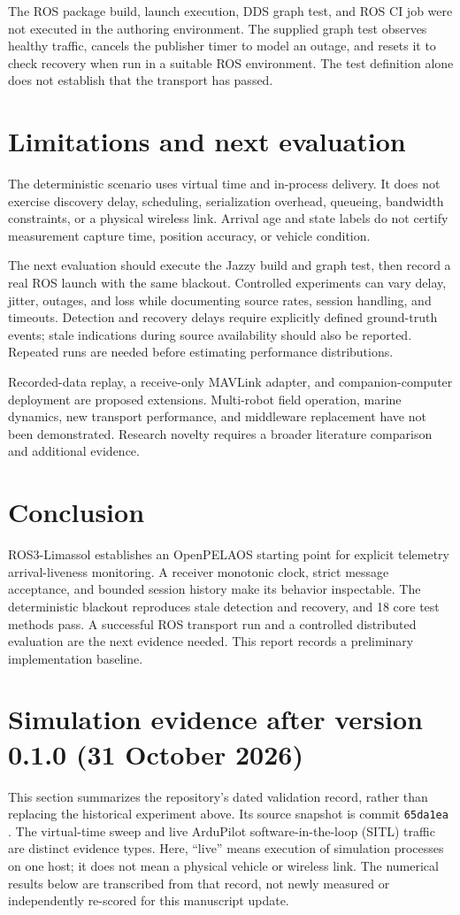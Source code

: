 \documentclass[11pt,a4paper]{article}
\newcommand{\code}[1]{\texttt{#1}}
\begin{document}
The ROS package build, launch execution, DDS graph test, and ROS CI job were not
executed in the authoring environment. The supplied graph test observes healthy
traffic, cancels the publisher timer to model an outage, and resets it to check
recovery when run in a suitable ROS environment. The test definition alone does
not establish that the transport has passed.

\section{Limitations and next evaluation}
The deterministic scenario uses virtual time and in-process delivery. It does not
exercise discovery delay, scheduling, serialization overhead, queueing, bandwidth
constraints, or a physical wireless link. Arrival age and state labels do not
certify measurement capture time, position accuracy, or vehicle condition.

The next evaluation should execute the Jazzy build and graph test, then record
a real ROS launch with the same blackout. Controlled experiments can vary delay,
jitter, outages, and loss while documenting source rates, session handling, and
timeouts. Detection and recovery delays require explicitly defined ground-truth
events; stale indications during source availability should also be reported.
Repeated runs are needed before estimating performance distributions.

Recorded-data replay, a receive-only MAVLink adapter, and companion-computer
deployment are proposed extensions. Multi-robot field operation, marine dynamics,
new transport performance, and middleware replacement have not been demonstrated.
Research novelty requires a broader literature comparison and additional evidence.

\section{Conclusion}
ROS3-Limassol establishes an OpenPELAOS starting point for explicit telemetry
arrival-liveness monitoring. A receiver monotonic clock, strict message acceptance,
and bounded session history make its behavior inspectable. The deterministic
blackout reproduces stale detection and recovery, and 18 core test methods pass.
A successful ROS transport run and a controlled distributed evaluation are the
next evidence needed. This report records a preliminary implementation baseline.

\section{Simulation evidence after version 0.1.0 (31 October 2026)}
\label{sec:simulation-update}
This section summarizes the repository's dated validation record, rather than
replacing the historical experiment above. Its source snapshot is commit
\code{65da1ea} \cite{simulation_record}.
The virtual-time sweep and live ArduPilot software-in-the-loop (SITL) traffic
are distinct evidence types. Here, ``live'' means execution of simulation
processes on one host; it does not mean a physical vehicle or wireless link.
The numerical results below are transcribed from that record, not newly
measured or independently re-scored for this manuscript update.
\end{document}
